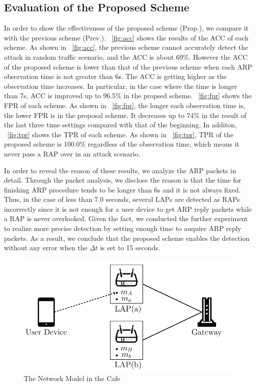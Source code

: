 \documentclass[conference]{IEEEtran}
\begin{document}
\subsection{Evaluation of the Proposed Scheme}
In order to show the effectiveness of the proposed scheme (Prop.), we compare it with the previous scheme \cite{previous} (Prev.).
\figurename~\ref{fig:acc} shows the results of the ACC of each scheme.
As shown in \figurename~\ref{fig:acc}, the previous scheme cannot accurately detect the attack in random traffic scenario, and the ACC is about 69\%.
However the ACC of the proposed scheme is lower than that of the previous scheme when each ARP observation time is not greater than 6s.
The ACC is getting higher as the observation time increases.
In particular, in the case where the time is longer than 7s, ACC is improved up to 96.5\% in the propsed scheme.
\figurename~\ref{fig:fpr} shows the FPR of each scheme.
As shown in \figurename~\ref{fig:fpr}, the longer each observation time is, the lower FPR is in the proposal scheme.
It decreases up to 74\% in the result of the last three time settings compared with that of the beginning.
In additon, \figurename~\ref{fig:tpr} shows the TPR of each scheme.
As shown in \figurename~\ref{fig:tpr}, TPR of the proposed scheme is 100.0\% regardless of the observation time, which means it never pass a RAP over in an attack scenario.

In order to reveal the reason of these results, we analyze the ARP packets in detail.
Through the packet analysis, we disclose the reason is that the time for finishing ARP procedure tends to be longer than 6s and it is not always fixed.
Thus, in the case of less than 7.0 seconds, several LAPs are detected as RAPs incorrectly since it is not enough for a user device to get ARP reply packets while a RAP is never overlooked.
Given the fact, we conducted the further experiment to realize more precise detection by setting enough time to auquire ARP reply packets.
As a result, we conclude that the proposed scheme enables the detection without any error when the $\Delta t$ is set to 15 seconds.
\begin{figure}[t]
    \begin{center}
        \includegraphics[scale=0.4]{starbucks/starbucks.pdf}
        \caption{The Network Model in the Cafe}
        \label{fig:sbx}
    \end{center}
    \vspace{-2zh}
\end{figure}
\end{document}
